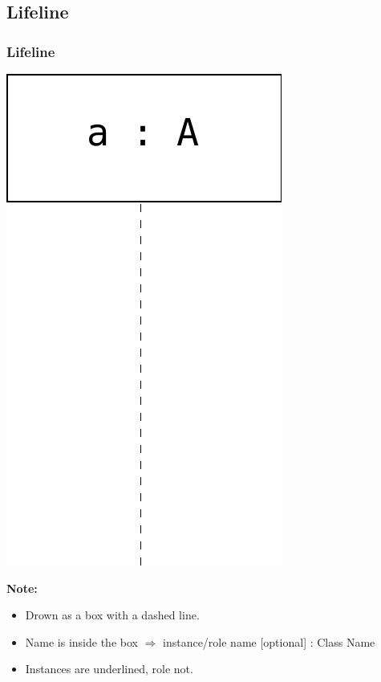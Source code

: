 \documentclass{beamer}
\begin{document}
\subsection{Lifeline}
\begin{frame}
	\frametitle{Lifeline}
	\begin{center}
		\includegraphics[scale=0.4]{box}
	\end{center}
	\textbf{Note:}
	\begin{itemize}
  			\item Drown as a box with a dashed line.
  			\item Name is inside the box  $\Rightarrow$ instance/role name [optional] : Class Name
  			\item Instances are underlined, role not.
	\end{itemize}
\end{frame}
\end{document}
